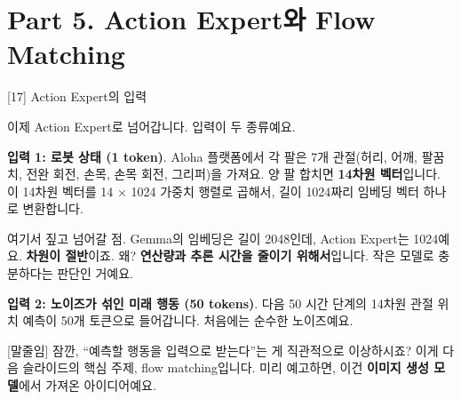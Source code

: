 \documentclass[aspectratio=169,10pt]{beamer}
\newenvironment{script}{%
  \footnotesize
  \setlength{\parskip}{0.5em}
  \setlength{\parindent}{0pt}
}{}
\begin{document}
\section{Part 5. Action Expert와 Flow Matching}

\begin{frame}{[17] Action Expert의 입력}
\begin{script}
이제 Action Expert로 넘어갑니다. 입력이 두 종류예요.

\textbf{입력 1: 로봇 상태 (1 token)}. Aloha 플랫폼에서 각 팔은 7개 관절(허리, 어깨, 팔꿈치, 전완 회전, 손목, 손목 회전, 그리퍼)을 가져요. 양 팔 합치면 \textbf{14차원 벡터}입니다. 이 14차원 벡터를 14 × 1024 가중치 행렬로 곱해서, 길이 \alert{1024}짜리 임베딩 벡터 하나로 변환합니다.

여기서 짚고 넘어갈 점. Gemma의 임베딩은 길이 2048인데, Action Expert는 1024예요. \textbf{차원이 절반}이죠. 왜? \textbf{연산량과 추론 시간을 줄이기 위해서}입니다. 작은 모델로 충분하다는 판단인 거예요.

\textbf{입력 2: 노이즈가 섞인 미래 행동 (50 tokens)}. 다음 50 시간 단계의 14차원 관절 위치 예측이 50개 토큰으로 들어갑니다. 처음에는 \alert{순수한 노이즈}예요.

[말줄임] 잠깐, ``예측할 행동을 입력으로 받는다''는 게 직관적으로 이상하시죠? 이게 다음 슬라이드의 핵심 주제, flow matching입니다. 미리 예고하면, 이건 \textbf{이미지 생성 모델}에서 가져온 아이디어예요.
\end{script}
\end{frame}
\end{document}
